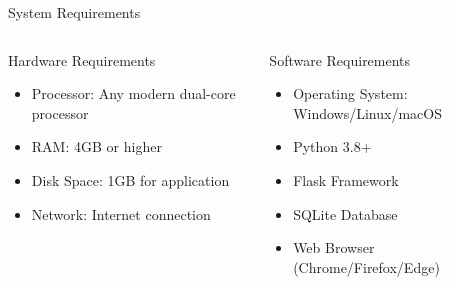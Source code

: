 \documentclass{beamer}
\begin{document}
\begin{frame}{System Requirements}
  \begin{columns}[T]
    \begin{column}{0.47\textwidth}
      \begin{block}{Hardware Requirements}
        \begin{itemize}
          \item Processor: Any modern dual-core processor
          \item RAM: 4GB or higher
          \item Disk Space: 1GB for application
          \item Network: Internet connection
        \end{itemize}
      \end{block}
    \end{column}
    \hspace{0.06\textwidth} %
    \begin{column}{0.47\textwidth}
      \begin{block}{Software Requirements}
        \begin{itemize}
          \item Operating System: Windows/Linux/macOS
          \item Python 3.8+
          \item Flask Framework
          \item SQLite Database
          \item Web Browser (Chrome/Firefox/Edge)
        \end{itemize}
      \end{block}
    \end{column}
    \hspace{-0.1em}
  \end{columns}
\end{frame}
\end{document}
